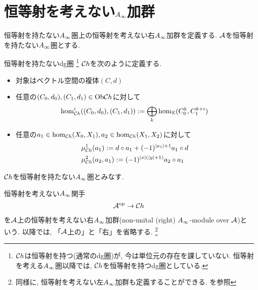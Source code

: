 \documentclass[uplatex, a4paper, 14Q, dvipdfmx]{jsarticle}
\begin{document}

  

\section{恒等射を考えない\texorpdfstring{$A_{\infty}$}{Ainf}加群}

恒等射を持たない$A_{\infty}$圏上の恒等射を考えない右$A_{\infty}$加群を定義する. 
$\mathcal{A}$を恒等射を持たない$A_{\infty}$圏とする. 

\begin{definition}[複体の圏$\Ch$]
  恒等射を持たないdg圏
  \footnote{
    $\Ch$は恒等射を持つ(通常のdg圏)が, 今は単位元の存在を課していない. 
    恒等射を考える$A_{\infty}$圏以降では, $\Ch$を恒等射を持つdg圏としている. 
  }
  $\Ch$を次のように定義する. 
  \begin{itemize}
    \item 対象はベクトル空間の複体$(C,d)$
    \item 任意の$(C_0,d_0), (C_1,d_1) \in \mathrm{Ob}\mathcal{C} h$に対して
    \begin{align*}
      \hom_{\mathcal{C} h}^i((C_0,d_0), (C_1,d_1)) 
      := \bigoplus_{k} \hom_{\mathbb{K}}(C_0^k,C_1^{k+i})
    \end{align*}
    \item 任意の$a_1 \in \hom_{\mathcal{C} h}(X_0,X_1), a_2 \in \hom_{\mathcal{C} h}(X_1,X_2)$に対して 
    \begin{align*}
      &\mu^1_{\mathcal{C} h}(a_1) := d \circ a_1 + (-1)^{|a_1|+1} a_1 \circ d \\
      &\mu^2_{\mathcal{C} h}(a_2,a_1) := (-1)^{|x|(|y|+1)} a_2 \circ a_1
    \end{align*}
  \end{itemize}
  $\Ch$を恒等射を持たない$A_{\infty}$圏とみなす. 
\end{definition}

\begin{definition}
  恒等射を考えない$A_{\infty}$関手
  \begin{align*}
    \mathcal{A}^\mathrm{op} \to \mathcal{C} h
  \end{align*}
  を$\mathcal{A}$上の恒等射を考えない右$A_{\infty}$加群(non-unital (right) $A_{\infty}$-module over $\mathcal{A}$)という. 
  以降では, 「$\mathcal{A}$上の」と「右」を省略する. 
  \footnote{
    同様に, 恒等射を考えない左$A_{\infty}$加群も定義することができる. \cite{Fuk02}を参照
  }
\end{definition}
\end{document}
